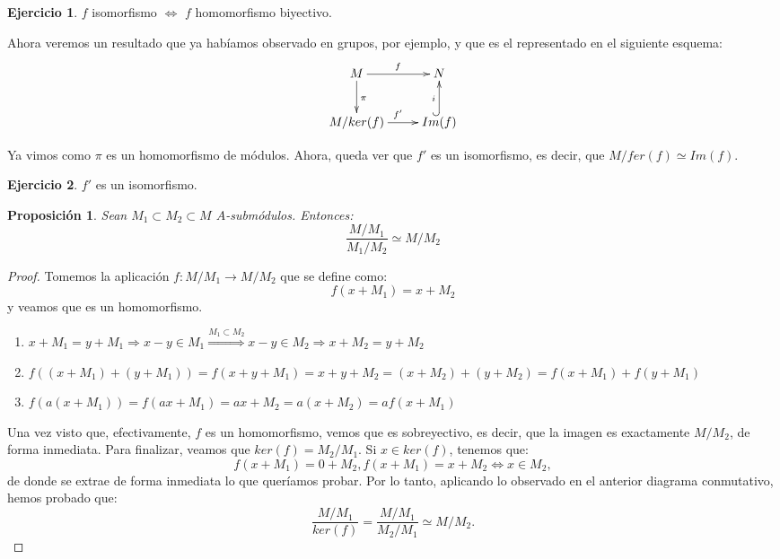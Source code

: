 \documentclass{article}
\theoremstyle{theorem-style}  %
\newtheorem{proposition}[theorem]{Proposición}
\theoremstyle{definition}
\theoremstyle{example-style}
\newtheorem{exercise}{Ejercicio}[section]
\begin{document}
\begin{exercise}
	$f$ isomorfismo $\Leftrightarrow$ $f$ homomorfismo biyectivo.
\end{exercise}

Ahora veremos un resultado que ya habíamos observado en grupos, por ejemplo, y que es el representado en el siguiente esquema:
\[
\xymatrix{
	M \ar[d]^{\pi} \ar[r]^f & N \\
	M/ker(f) \ar[r]^{f'} & Im(f) \ar@{^{(}->}[u]^i
}
\]

Ya vimos como $\pi$ es un homomorfismo de módulos. Ahora, queda ver que $f'$ es un isomorfismo, es decir, que $M/fer(f)\simeq Im(f)$.
\begin{exercise}
	$f'$ es un isomorfismo.
\end{exercise}
\begin{proposition}
	Sean $M_1\subset M_2\subset M$ $A$-submódulos. Entonces:
	\[\frac{M/M_1}{M_1/M_2}\simeq M/M_2\]
\end{proposition}


\begin{proof}
	Tomemos la aplicación $f:M/M_1 \rightarrow M/M_2$ que se define como:
	\[f(x + M_1) = x + M_2\]
	y veamos que es un homomorfismo.
	\begin{enumerate}
		\item $x + M_1 = y + M_1 \Rightarrow x-y\in M_1  \stackrel{M_1\subset M_2}{\Rightarrow}  x-y \in M_2 \Rightarrow x + M_2 = y + M_2$
		\item $f((x+M_1)+(y + M_1)) = f(x+y+M_1) = x+y+M_2 = (x+M_2)+(y+M_2) = f(x+M_1) + f(y+M_1)$
		\item $f(a(x+M_1)) = f(ax + M_1) = ax + M_2 = a(x + M_2) = af(x+M_1)$
	\end{enumerate}
	Una vez visto que, efectivamente, $f$ es un homomorfismo, vemos que es sobreyectivo, es decir, que la imagen es exactamente $M/M_2$, de forma inmediata. Para finalizar, veamos que $ker(f) = M_2/M_1$. Si $x\in ker(f)$, tenemos que:
	\[f(x + M_1) = 0 + M_2, f(x + M_1) = x + M_2 \Leftrightarrow x \in M_2,\]
	de donde se extrae de forma inmediata lo que queríamos probar.
	Por lo tanto, aplicando lo observado en el anterior diagrama conmutativo, hemos probado que:
	\[\frac{M/M_1}{ker(f)} = \frac{M/M_1}{M_2/M_1} \simeq M/M_2.\]
\end{proof}
\end{document}
